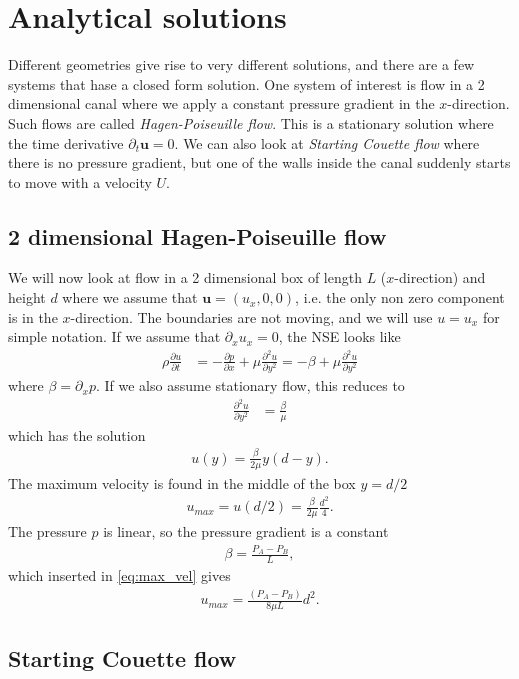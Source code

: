 \documentclass[a4paper,10pt]{article}
\renewcommand{\vec}[1]{\mathbf{#1}}
\renewcommand{\(}{\left(}
\renewcommand{\)}{\right)}
\newcommand{\dpart}[2]{\frac{\partial#1}{\partial#2}}
\newcommand{\dpartt}[2]{\frac{\partial^2#1}{\partial#2^2}}
\begin{document}
\section{Analytical solutions}
Different geometries give rise to very different solutions, and there are a few systems that hase a closed form solution. One system of interest is flow in a 2 dimensional canal where we apply a constant pressure gradient in the $x$-direction. Such flows are called \textit{Hagen-Poiseuille flow}. This is a stationary solution where the time derivative $\partial_t \vec u=0$. We can also look at \textit{Starting Couette flow} where there is no pressure gradient, but one of the walls inside the canal suddenly starts to move with a velocity $U$.

\subsection{2 dimensional Hagen-Poiseuille flow}
We will now look at flow in a 2 dimensional box of length $L$ ($x$-direction) and height $d$ where we assume that $\vec u = (u_x,0,0)$, i.e. the only non zero component is in the $x$-direction. The boundaries are not moving, and we will use $u=u_x$ for simple notation. If we assume that $\partial_x u_x=0$, the NSE looks like
\begin{align*}
  \rho\dpart{u}{t} &= -\dpart{p}{x} + \mu\dpartt{u}{y} = -\beta + \mu\dpartt{u}{y}
\end{align*}
where $\beta = \partial_x p$. If we also assume stationary flow, this reduces to
\begin{align*}
  \dpartt{u}{y} &= \frac{\beta}{\mu}
\end{align*}
which has the solution
\begin{align*}
  u(y) = \frac{\beta}{2\mu}y(d-y).
\end{align*}
The maximum velocity is found in the middle of the box $y=d/2$
\begin{align}
  \label{eq:max_vel}
  u_{max} = u(d/2) = \frac{\beta}{2\mu}\frac{d^2}{4}.
\end{align}
The pressure $p$ is linear, so the pressure gradient is a constant
\begin{align*}
  \beta = \frac{P_A-P_B}{L},
\end{align*}
which inserted in \eqref{eq:max_vel} gives
\begin{align*}
  u_{max} = \frac{(P_A-P_B)}{8\mu L}d^2.
\end{align*}
\subsection{Starting Couette flow}
\end{document}
